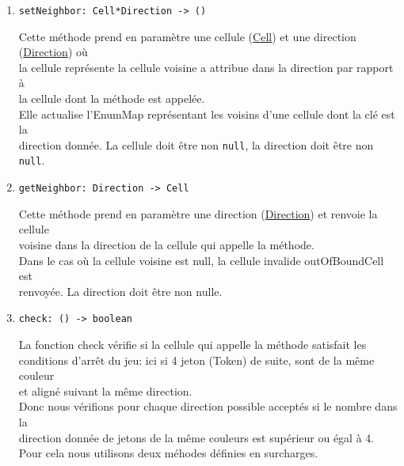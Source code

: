 \documentclass[11pt]{article}
\begin{document}
\begin{enumerate}
\item \texttt{setNeighbor: Cell*Direction -> ()} \label{org334d463}
\label{sec:orgd3b96b5}

Cette méthode prend en paramètre une cellule (\hyperref[org4b22c5b]{Cell}) et une direction (\hyperref[orged4a61f]{Direction}) où\\
la cellule représente la cellule voisine a attribue dans la direction par rapport à\\
la cellule dont la méthode est appelée.\\

Elle actualise l'EnumMap représentant les voisins d'une cellule dont la clé est la\\
direction donnée. La cellule doit être non \texttt{null}, la direction doit être non \texttt{null}.\\

\item \texttt{getNeighbor: Direction -> Cell} \label{orgcd6285a}
\label{sec:orgc5e8bf8}

Cette méthode prend en paramètre une direction (\hyperref[orged4a61f]{Direction}) et renvoie la cellule\\
voisine dans la direction de la cellule qui appelle la méthode.\\

Dans le cas où la cellule voisine est null, la cellule invalide outOfBoundCell est\\
renvoyée. La direction doit être non nulle.\\

\item \texttt{check: () -> boolean}
\label{sec:org52654ca}

La fonction check vérifie si la cellule qui appelle la méthode satisfait les\\
conditions d'arrêt du jeu: ici si 4 jeton (Token) de suite, sont de la même couleur\\
et aligné suivant la même direction.\\

Donc nous vérifions pour chaque direction possible acceptés si le nombre dans la\\
direction donnée de jetons de la même couleurs est supérieur ou égal à 4.\\

Pour cela nous utilisons deux méhodes définies en surcharges.\\


\end{enumerate}
\end{document}
